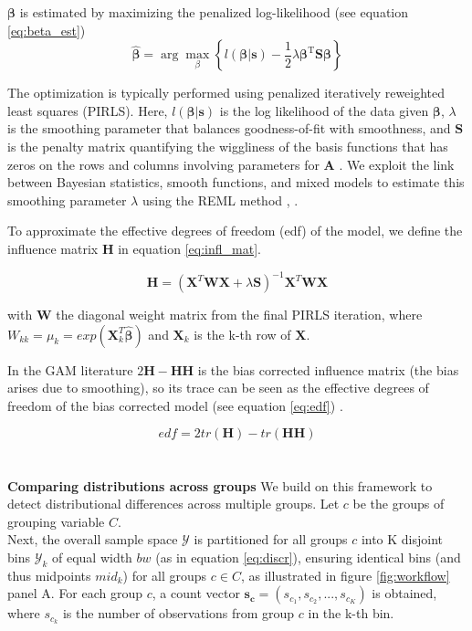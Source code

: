 $\boldsymbol{\beta}$ is estimated by maximizing the penalized log-likelihood (see equation \ref{eq:beta_est})
\begin{equation}
    \hat{\boldsymbol{\beta}}=\arg \max _{\beta}\left\{l(\boldsymbol{\beta}|\boldsymbol{s})-\frac{1}{2} \lambda \boldsymbol{\beta}^{\mathrm{T}} \boldsymbol{S} \boldsymbol{\beta}\right\}
    \label{eq:beta_est}
\end{equation}

The optimization is typically performed using penalized iteratively reweighted least squares (PIRLS). Here, $l(\boldsymbol{\beta}|\boldsymbol{s})$ is the log likelihood of the data given $\boldsymbol{\beta}$, $\lambda$ is the smoothing parameter that balances goodness-of-fit with smoothness, and $\boldsymbol{S}$ is the penalty matrix quantifying the wiggliness of the basis functions that has zeros on the rows and columns involving parameters for $\boldsymbol{A}$ \cite{gambook_gamtheory_setup}. We exploit the link between Bayesian statistics, smooth functions, and mixed models to estimate this smoothing parameter $\lambda$ using the REML method \cite{gambook_gamtheory_reml}, \cite{ruppert_reml}.

To approximate the effective degrees of freedom (edf) of the model, we define the influence matrix $\boldsymbol{H}$ in equation \ref{eq:infl_mat}.

\begin{equation}
    \boldsymbol{H} = (\boldsymbol{X}^T\boldsymbol{W}\boldsymbol{X} + \lambda \boldsymbol{S})^{-1}\boldsymbol{X}^T\boldsymbol{W}\boldsymbol{X}
    \label{eq:infl_mat}
\end{equation}

with $\boldsymbol{W}$ the diagonal weight matrix from the final PIRLS iteration, where $W_{kk} = \mu_k = exp(\boldsymbol{X}_k^T \hat{\boldsymbol{\beta}})$ and $\boldsymbol{X}_k$ is the k-th row of $\boldsymbol{X}$.

In the GAM literature $2\boldsymbol{H} - \boldsymbol{H}\boldsymbol{H}$ is the bias corrected influence matrix (the bias arises due to smoothing), so its trace can be seen as the effective degrees of freedom of the bias corrected model (see equation \ref{eq:edf}) \cite{gambook_gamtheory_edf}.

\begin{equation}
    edf = 2tr(\boldsymbol{H}) - tr(\boldsymbol{H}\boldsymbol{H})
    \label{eq:edf}
\end{equation}
\\
\\
\textbf{Comparing distributions across groups} We build on this framework to detect distributional differences across multiple groups. Let $c$ be the groups of grouping variable $C$.\\ 
Next, the overall sample space $\mathscr{Y}$ is partitioned for all groups $c$ into K disjoint bins $\mathscr{Y}_k$ of equal width $bw$ (as in equation \ref{eq:discr}), ensuring identical bins (and thus midpoints $mid_k$) for all groups $c \in C$, as illustrated in figure \ref{fig:workflow} panel A. For each group $c$, a count vector $\boldsymbol{s_c} = (s_{c_1}, s_{c_2},...,s_{c_K})$ is obtained, where $s_{c_k}$ is the number of observations from group $c$ in the k-th bin.

